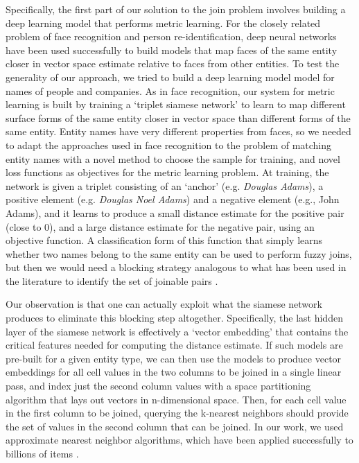 Specifically, the first part of our solution to the join problem involves building a deep learning model that performs metric learning.  For the closely related problem of face recognition and person re-identification, deep neural networks have been used successfully to build models that map faces of the same entity closer in vector space estimate relative to faces from other entities.  To test the generality of our approach, we tried to build a deep learning model model for names of people and companies. As in face recognition, our system for metric learning is built by training a `triplet siamese network' to learn to map different surface forms of the same entity closer in vector space than different forms of the same entity.  Entity names have very different properties from faces, so we needed to adapt the approaches used in face recognition to the problem of matching entity names with a novel method to choose the sample for training, and novel loss functions as objectives for the metric learning problem.  At training, the network is given a triplet consisting of an `anchor' (e.g. \textit{Douglas Adams}), a positive element (e.g. \textit{Douglas Noel Adams}) and a negative element (e.g., John Adams), and it learns to produce a small distance estimate for the positive pair (close to 0), and a large distance estimate for the negative pair, using an objective function. A classification form of this function that simply learns whether two names belong to the same entity can be used to perform fuzzy joins, but then we would need a blocking strategy analogous to what has been used in the literature to identify the set of joinable pairs \cite{auto-join-joining-tables-leveraging-transformations}.  

Our observation is that one can actually exploit what the siamese network produces to eliminate this blocking step altogether.  Specifically, the last hidden layer of the siamese network is effectively a `vector embedding' that contains the critical features needed for computing the distance estimate.  If such models are pre-built for a given entity type, we can then use the models to produce vector embeddings for all cell values in the two columns to be joined in a single linear pass, and index just the second column values with a space partitioning algorithm that lays out vectors in n-dimensional space.  Then, for each cell value in the first column to be joined, querying the k-nearest neighbors should provide the set of values in the second column that can be joined. In our work, we used approximate nearest neighbor algorithms, which have been applied successfully to billions of items \cite{JDH17}.

